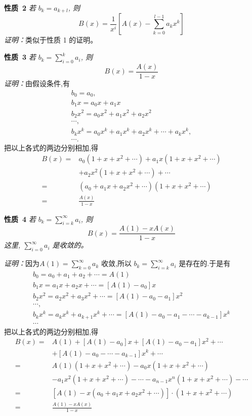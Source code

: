 \documentclass{report}
\begin{document}
\noindent
\textbf{性质\ 2} \textsl{若 $b_{k}=a_{k+l}$, 则
$$
B(x)=\frac{1}{x^{i}}\left[A(x)-\sum_{k=0}^{l-1} a_{k} x^{k}\right]
$$
}
\textsl{证明：}类似于性质 1 的证明。

\noindent
\textbf{性质\ 3} \textsl{若 $b_{k}=\sum_{i=0}^{k} a_{i}$, 则
$$
B(x)=\frac{A(x)}{1-x}
$$
证明：}由假设条件,有
$$
\begin{array}{l}
b_{0}=a_{0}, \\
b_{1} x=a_{0} x+a_{1} x \\
b_{2} x^{2}=a_{0} x^{2}+a_{1} x^{2}+a_{2} x^{2} \\
\cdots, \\
b_{k} x^{k}=a_{0} x^{k}+a_{1} x^{k}+a_{2} x^{k}+\cdots+a_{k} x^{k}, \\
\cdots .
\end{array}
$$
把以上各式的两边分别相加,得
$$
\begin{aligned}
B(x)=& a_{0}\left(1+x+x^{2}+\cdots\right)+a_{1} x\left(1+x+x^{2}+\cdots\right) \\
&+a_{2} x^{2}\left(1+x+x^{2}+\cdots\right)+\cdots \\
=&\left(a_{0}+a_{1} x+a_{2} x^{2}+\cdots\right)\left(1+x+x^{2}+\cdots\right) \\
=& \frac{A(x)}{1-x}
\end{aligned}
$$

\noindent
\textbf{性质\ 4} \textsl{若 $b_{k}=\sum_{i=k}^{\infty} a_{i}$, 则
$$
B(x)=\frac{A(1)-x A(x)}{1-x}
$$
这里, $\sum_{i=0}^{\infty} a_{i}$ 是收敛的。}

\noindent
\textsl{证明：}因为$A(1)=\sum_{k=0}^{\infty} a_{k}$ 收敛,所以 $b_{k}=\sum_{i=k}^{\infty} a_{i}$ 是存在的.于是有
$$
\begin{array}{l}
b_{0}=a_{0}+a_{1}+a_{2}+\cdots=A(1) \\
b_{1} x=a_{1} x+a_{2} x+\cdots=\left[A(1)-a_{0}\right] x \\
b_{2} x^{2}=a_{2} x^{2}+a_{3} x^{2}+\cdots=\left[A(1)-a_{0}-a_{1}\right] x^{2} \\
\cdots, \\
b_{k} x^{k}=a_{k} x^{k}+a_{k+1} x^{k}+\cdots=\left[A(1)-a_{0}-a_{1}-\cdots-a_{k-1}\right] x^{k} \\
\cdots
\end{array}
$$
把以上各式的两边分别相加,得
$$
\begin{aligned}
B(x)=& A(1)+\left[A(1)-a_{0}\right] x+\left[A(1)-a_{0}-a_{1}\right] x^{2}+\cdots \\
&+\left[A(1)-a_{0}-\cdots-a_{k-1}\right] x^{k}+\cdots \\
=& A(1)\left(1+x+x^{2}+\cdots\right)-a_{0} x\left(1+x+x^{2}+\cdots\right) \\
&-a_{1} x^{2}\left(1+x+x^{2}+\cdots\right)-\cdots-a_{n-1} x^{n}\left(1+x+x^{2}+\cdots\right)-\cdots \\
=&\left[A(1)-x\left(a_{0}+a_{1} x+a_{2} x^{2}+\cdots\right)\right] \cdot\left(1+x+x^{2}+\cdots\right) \\
=& \frac{A(1)-x A(x)}{1-x}
\end{aligned}
$$
\end{document}
